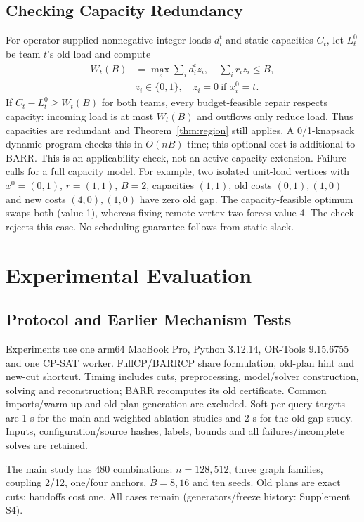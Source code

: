 \documentclass[conference]{IEEEtran}
\begin{document}
\subsection{Checking Capacity Redundancy}
For operator-supplied nonnegative integer loads $d_i^t$ and static capacities $C_t$, let $L_t^0$ be team $t$'s old load and compute
\begin{equation}
\begin{aligned}
 W_t(B)&=\max_z\sum_i d_i^t z_i,\quad \sum_i r_i z_i\le B,\\
 &z_i\in\{0,1\},\quad z_i=0\ \text{if }x_i^0=t.
\end{aligned}
\end{equation}
If $C_t-L_t^0\ge W_t(B)$ for both teams, every budget-feasible repair respects capacity: incoming load is at most $W_t(B)$ and outflows only reduce load. Thus capacities are redundant and Theorem~\ref{thm:region} still applies. A 0/1-knapsack dynamic program checks this in $O(nB)$ time; this optional cost is additional to BARR. This is an applicability check, not an active-capacity extension. Failure calls for a full capacity model. For example, two isolated unit-load vertices with $x^0=(0,1)$, $r=(1,1)$, $B=2$, capacities $(1,1)$, old costs $(0,1),(1,0)$ and new costs $(4,0),(1,0)$ have zero old gap. The capacity-feasible optimum swaps both (value 1), whereas fixing remote vertex two forces value 4. The check rejects this case. No scheduling guarantee follows from static slack.

\section{Experimental Evaluation}
\subsection{Protocol and Earlier Mechanism Tests}
Experiments use one arm64 MacBook Pro, Python 3.12.14, OR-Tools 9.15.6755 and one CP-SAT worker. FullCP/BARRCP share formulation, old-plan hint and new-cut shortcut. Timing includes cuts, preprocessing, model/solver construction, solving and reconstruction; BARR recomputes its old certificate. Common imports/warm-up and old-plan generation are excluded. Soft per-query targets are 1 s for the main and weighted-ablation studies and 2 s for the old-gap study. Inputs, configuration/source hashes, labels, bounds and all failures/incomplete solves are retained.

The main study has 480 combinations: $n=128,512$, three graph families, coupling 2/12, one/four anchors, $B=8,16$ and ten seeds. Old plans are exact cuts; handoffs cost one. All cases remain (generators/freeze history: Supplement S4).
\end{document}
